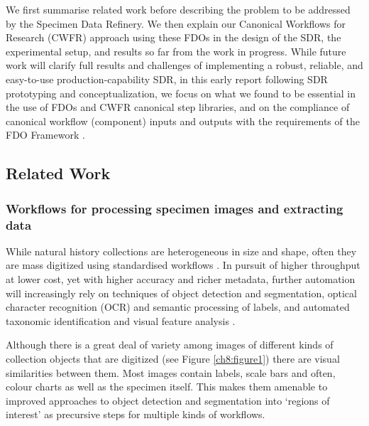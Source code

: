 We first summarise related work before describing the problem to be
addressed by the Specimen Data Refinery. We then explain our Canonical
Workflows for Research (CWFR)
approach using these FDOs in the design of
the SDR, the experimental setup, and results so far from the work in
progress. While future work will clarify full results and challenges of
implementing a robust, reliable, and easy-to-use production-capability
SDR, in this early report following SDR prototyping and
conceptualization, we focus on what we found to be essential in the use
of FDOs and CWFR canonical step libraries, and on the compliance of
canonical workflow (component) inputs and outputs with the requirements
of the FDO Framework \cite{Bonino 2019}.

\subsection{Related Work}\label{related-work}

\subsubsection{Workflows for processing specimen images and extracting data}\label{workflows-for-processing-specimen-images-and-extracting-data}

While natural history collections are heterogeneous in size and shape,
often they are mass digitized using standardised workflows \cite{Sweeney 2018,Allan 2019,Hereld 2019,Price 2018,Tegelberg 2017}.
In pursuit of higher throughput at lower cost, yet with higher accuracy
and richer metadata, further automation will increasingly rely on
techniques of object detection and segmentation, optical character
recognition (OCR) and semantic processing of labels, and automated
taxonomic identification and visual feature analysis \cite{Walton 2020a,Owen 2020}.

Although there is a great deal of variety among images of different
kinds of collection objects that are digitized (see Figure \vref{ch8:figure1}) there are
visual similarities between them. Most images contain labels, scale bars
and often, colour charts as well as the specimen itself. This makes them
amenable to improved approaches to object detection \cite{Triki 2020} and
segmentation into `regions of interest' \cite{Nieva de la Hidalga 2021} as precursive steps for
multiple kinds of workflows.

